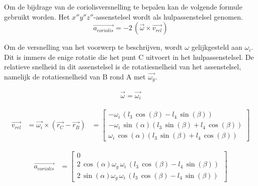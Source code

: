 Om de bijdrage van de coriolisversnelling te bepalen kan de volgende formule gebruikt worden. Het $x''y''z''$-assenstelsel wordt als hulpassenstelsel genomen.
\begin{equation*}
\overrightarrow{a_{coriolis}}=-2\,(\overrightarrow{\omega}\times\overrightarrow{v_{rel}})
\end{equation*}

Om de versnelling van het voorwerp te beschrijven, wordt $\omega$ gelijkgesteld aan $\omega_{i}$. Dit is immers de enige rotatie die het punt C uitvoert in het hulpassenstelsel. De relatieve snelheid in dit assenstelsel is de rotatiesnelheid van het assenstelsel, namelijk de rotatiesnelheid van B rond A met $\overrightarrow{\omega_{g}}$. 

\begin{equation*}
\begin{split}
\overrightarrow{\omega}=\overrightarrow{\omega_{i}}
\end{split}
\end{equation*}

\begin{equation*}
\begin{split}
\overrightarrow{v_{rel}}&= \overrightarrow{\omega_{i}}\times(\overrightarrow{r_{C}}-\overrightarrow{r_{B}})
&=	\begin{bmatrix}
	-\omega_{i}\, \left( l_{3}\,\cos \left( \beta \right) -l_{4}\,\sin \left( \beta \right)  \right) \\
	-\omega_{i}\,\sin \left( \alpha \right)  \left( l_{3}\,\sin \left( \beta \right) +l_{4}\,\cos \left( \beta \right) \right) \\
	\omega_{i}\,\cos \left( \alpha \right) \left( l_{3}\,\sin \left( \beta \right) +l_{4}\,\cos \left( \beta\right)  \right) \
\end{bmatrix}
\end{split}
\end{equation*}

\begin{equation*}
\begin{split}
\overrightarrow{a_{coriolis}}&=
\begin{bmatrix}
0\\
2\,\cos \left( \alpha\right) \omega_{g}\,\omega_{i}\, \left( l_{3}\,\cos \left( \beta\right) -l_{4}\,\sin \left( \beta \right)  \right) \\
2\,\sin \left( \alpha \right) \omega_{g}\,\omega_{i}\, \left( l_{3}\,\cos \left( \beta \right) -l_{4}\,\sin \left( \beta \right)  \right) \
\end{bmatrix}
\end{split}
\end{equation*}